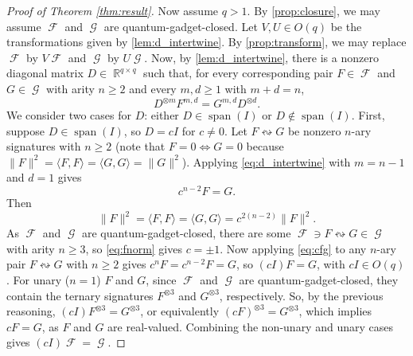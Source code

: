 \documentclass{article}
\DeclareMathOperator{\spn}{span}
\DeclareMathOperator{\rr}{\mathbb{R}}
\DeclareMathOperator{\fc}{\mathcal{F}}
\DeclareMathOperator{\gc}{\mathcal{G}}
\begin{document}
\begin{proof}[Proof of Theorem \ref{thm:result}]
    Now assume $q > 1$. By \autoref{prop:closure}, we may assume $\fc$ and $\gc$ are 
    quantum-gadget-closed. Let $V,U \in O(q)$ be the transformations given by 
    \autoref{lem:d_intertwine}.
    By \autoref{prop:transform}, we may replace $\fc$ by $V \fc$ and $\gc$ by $U \gc$.
    Now, by \autoref{lem:d_intertwine},
    there is a nonzero diagonal matrix $D \in \rr^{q \times q}$ such that,
    for every corresponding pair $F \in \fc$ and $G \in \gc$ with
    arity $n \geq 2$ and every $m,d \geq 1$ with $m+d = n$,
    \begin{equation}
        D^{\otimes m} F^{m,d} = G^{m,d} D^{\otimes d}.
        \label{eq:d_intertwine}
    \end{equation}
    We consider two cases for $D$: either $D \in \spn(I)$ or $D \not\in \spn(I)$.
    First, suppose $D \in \spn(I)$, so $D = cI$ for $c \neq 0$. 
    Let $F \leftrightsquigarrow G$ be nonzero $n$-ary signatures with $n \geq 2$
    (note that $F = 0 \iff G = 0$ because
    $\|F\|^2 = \langle F,F\rangle = \langle G,G\rangle = \|G\|^2$).
    Applying \eqref{eq:d_intertwine} with $m = n-1$ and $d = 1$ gives
    \begin{equation}
        \label{eq:cfg}
        c^{n-2} F = G.
    \end{equation}
    Then
    \begin{equation}
        \label{eq:fnorm}
        \|F\|^2 = \langle F,F\rangle = \langle G,G\rangle = c^{2(n-2)}\|F\|^2.
    \end{equation}
    As $\fc$ and $\gc$ are quantum-gadget-closed, there are some
    $\fc \ni F \leftrightsquigarrow G \in \gc$ with arity $n \geq 3$, 
    so \eqref{eq:fnorm} gives $c = \pm 1$.
    Now applying \eqref{eq:cfg} to any $n$-ary pair $F \leftrightsquigarrow G$ with $n \geq 2$
    gives $c^nF = c^{n-2}F = G$, so $(cI) F = G$, with $cI \in O(q)$.
    For unary ($n=1$) $F$ and $G$, since $\fc$ and $\gc$ are quantum-gadget-closed, they contain the 
    ternary signatures $F^{\otimes 3}$ and $G^{\otimes 3}$, respectively. So,
    by the previous reasoning, $(cI) F^{\otimes 3} = G^{\otimes 3}$, or equivalently
    $(cF)^{\otimes 3} = G^{\otimes 3}$, which implies $cF = G$, as $F$ and $G$ are 
    real-valued. Combining the non-unary and unary cases gives $(cI) \fc = \gc$.


\end{proof}
\end{document}
